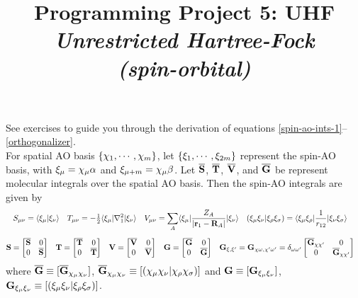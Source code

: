 \documentclass[fleqn]{article}
\title{Programming Project 5: UHF\\
\textit{Unrestricted Hartree-Fock\\(spin-orbital)}}
\author{}
\date{}
\begin{document}
\maketitle
\vspace{-1cm}
\noindent
See exercises to guide you through the derivation of equations \ref{spin-ao-ints-1}--\ref{orthogonalizer}.\\

\noindent
{}
For spatial AO basis $\{\chi_1,\cdots,\chi_m\}$, let $\{\xi_1,\cdots,\xi_{2m}\}$ represent the spin-AO basis, with $\xi_\mu=\chi_\mu\alpha$ and $\xi_{\mu+m}=\chi_\mu\beta$.
Let $\mathbf{\overline{S}}$, $\mathbf{\overline{T}}$, $\mathbf{\overline{V}}$, and $\mathbf{\overline{G}}$ be represent molecular integrals over the spatial AO basis.  Then the spin-AO integrals are given by
\begin{gather}
\begin{aligned}
\label{spin-ao-ints}
&
  S_{\mu\nu}
=
  \langle\xi_{\mu}|\xi_{\nu}\rangle
&&
  T_{\mu\nu}
=
  -\tfrac{1}{2}\langle\xi_{\mu}|\nabla_1^2|\xi_{\nu}\rangle
&&
  V_{\mu\nu}
=
  \sum_A\langle\xi_{\mu}|\dfrac{Z_A}{|\mathbf{r}_1-\mathbf{R}_A|}|\xi_{\nu}\rangle
&&
  (\xi_\mu\xi_\nu|\xi_\rho\xi_\sigma)
=
  \langle\xi_\mu\xi_\rho|\dfrac{1}{r_{12}}|\xi_\nu\xi_\sigma\rangle
\end{aligned}\\[5pt]
\begin{aligned}
\label{spin-ao-ints-1}
&
  \mathbf{S}
=
  \begin{bmatrix}\overline{\mathbf{S}}&0\\0&\overline{\mathbf{S}}\end{bmatrix}
&&
  \mathbf{T}
=
  \begin{bmatrix}\overline{\mathbf{T}}&0\\0&\overline{\mathbf{T}}\end{bmatrix}
&&
  \mathbf{V}
=
  \begin{bmatrix}\overline{\mathbf{V}}&0\\0&\overline{\mathbf{V}}\end{bmatrix}
&&
  \mathbf{G}
=
  \begin{bmatrix}\overline{\mathbf{G}}&0\\0&\overline{\mathbf{G}}\end{bmatrix}
&&
  \mathbf{G}_{\xi,\xi'}
=
  \mathbf{G}_{\chi\omega,\chi'\omega'}
=
  \delta_{\omega\omega'}
  \begin{bmatrix}\overline{\mathbf{G}}_{\chi\chi'}&0\\0&\overline{\mathbf{G}}_{\chi\chi'}\end{bmatrix}
\end{aligned}
\end{gather}
where
$
  \overline{\mathbf{G}}
\equiv
  [\overline{\mathbf{G}}_{\chi_\mu\chi_\nu}]$,
$
  \overline{\mathbf{G}}_{\chi_\mu\chi_\nu}
\equiv
  [(\chi_\mu\chi_\nu|\chi_\rho\chi_\sigma)]
$
and
$
  \mathbf{G}
\equiv
  [\mathbf{G}_{\xi_\mu\xi_\nu}]
$,
$
  \mathbf{G}_{\xi_\mu\xi_\nu}
\equiv
  [(\xi_\mu\xi_\nu|\xi_\rho\xi_\sigma)]
$.\\
\end{document}
